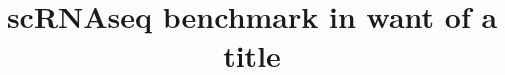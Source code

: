 \documentclass{bmcart}
\begin{document}
\begin{frontmatter}

\begin{fmbox}


\title{scRNAseq benchmark in want of a title}


\author[
   addressref={aff1,aff2},                   %
   corref={aff1},                       %
   email={pierre-luc.germain@hest.ethz.ch}   %
]{ }
\author[
   addressref={aff1},
   corref={aff1},                       %
   email={mark.robinson@imls.uzh.ch}
]{ }


\address[id=aff1]{
  , %
  ,
  ,
}
\address[id=aff2]{
  ,
  ,
  ,
}


\end{fmbox}
\end{frontmatter}
\end{document}
